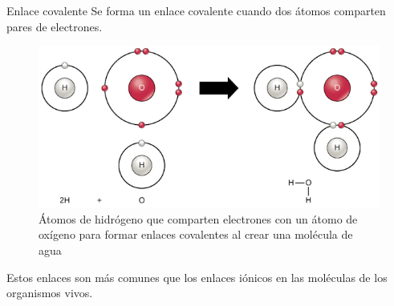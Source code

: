 \begin{infocard}{Enlace covalente}
    Se forma un enlace covalente cuando dos átomos comparten pares de electrones.
    \begin{figure}[H]
        \centering
        \includegraphics[width=0.9\linewidth]{../images/2e56e620e79858d5dca7103b22dbde6eb5c52f0c}
        \caption{Átomos de hidrógeno que comparten electrones con un átomo de oxígeno para formar enlaces covalentes al crear una molécula de agua
        }
        \label{fig:enlace_covalente}
    \end{figure}

    Estos enlaces son más comunes que los enlaces iónicos en las moléculas de los organismos vivos.
\end{infocard}
